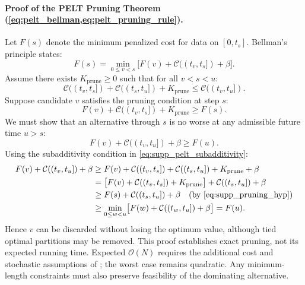 \paragraph{Proof of the PELT Pruning Theorem
(\cref{eq:pelt_bellman,eq:pelt_pruning_rule}).}
Let $F(s)$ denote the minimum penalized cost for data on $[0, t_s]$.
Bellman's principle states:
\begin{equation}
  F(s) = \min_{0 \le v < s} \bigl[ F(v) + \mathcal{C}((t_v, t_s]) +
  \beta \bigr].
\end{equation}
Assume there exists $K_{\mathrm{prune}} \ge 0$ such that for all $v < s < u$:
\begin{equation}
  \mathcal{C}((t_v, t_s]) + \mathcal{C}((t_s, t_u]) +
  K_{\mathrm{prune}} \le \mathcal{C}((t_v, t_u]).
  \label{eq:supp_pelt_subadditivity}
\end{equation}
Suppose candidate $v$ satisfies the pruning condition at step $s$:
\begin{equation}
  F(v) + \mathcal{C}((t_v, t_s]) + K_{\mathrm{prune}} \ge F(s).
  \label{eq:supp_pruning_hyp}
\end{equation}
We must show that an alternative through $s$ is no worse at any admissible
future time $u>s$:
\begin{equation}
  F(v) + \mathcal{C}((t_v, t_u]) + \beta \ge F(u).
\end{equation}
Using the subadditivity condition in \cref{eq:supp_pelt_subadditivity}:
\begin{equation}
  \begin{aligned}
    F(v) + \mathcal{C}((t_v, t_u]) + \beta
    &\ge F(v) + \mathcal{C}((t_v, t_s]) + \mathcal{C}((t_s, t_u]) +
    K_{\mathrm{prune}} + \beta \\
    &= \bigl[ F(v) + \mathcal{C}((t_v, t_s]) + K_{\mathrm{prune}}
    \bigr] + \mathcal{C}((t_s, t_u]) + \beta \\
    &\ge F(s) + \mathcal{C}((t_s, t_u]) + \beta \quad \text{(by
    \cref{eq:supp_pruning_hyp})} \\
    &\ge \min_{0 \le w < u} \bigl[ F(w) + \mathcal{C}((t_w, t_u]) +
    \beta \bigr] = F(u).
  \end{aligned}
\end{equation}
Hence $v$ can be discarded without losing the optimum value, although tied
optimal partitions may be removed. This proof establishes exact pruning,
not its expected running time. Expected $\mathcal{O}(N)$ requires the
additional cost and stochastic assumptions of \citet{killick2012}; the
worst case remains quadratic. Any minimum-length constraints must also
preserve feasibility of the dominating alternative.

